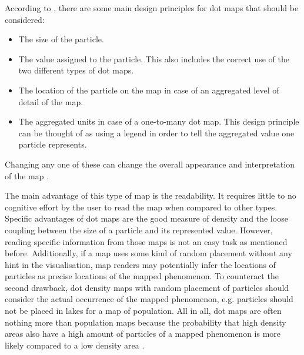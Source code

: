 According to \citeauthor{Tyner2010}, there are some main design principles for dot maps that should be considered:
\begin{itemize}
\item The size of the particle.
\item The value assigned to the particle. This also includes the correct use of the two different types of dot maps.
\item The location of the particle on the map in case of an aggregated level of detail of the map.
\item The aggregated units in case of a one-to-many dot map. This design principle can be thought of as using a legend in order to tell the aggregated value one particle represents.
\end{itemize}
Changing any one of these can change the overall appearance and interpretation of the map .

\cbstart
The main advantage of this type of map is the readability. It requires little to no cognitive effort by the user to read the map when compared to other types. Specific advantages of dot maps are the good measure of density and the loose coupling between the size of a particle and its represented value.
However, reading specific information from those maps is not an easy task as mentioned before. Additionally, if a map uses some kind of random placement without any hint in the visualisation, map readers may potentially infer the locations of particles as precise locations of the mapped phenomenon. To counteract the second drawback, dot density maps with random placement of particles should consider the actual occurrence of the mapped phenomenon, e.g. particles should not be placed in lakes for a map of population.
All in all, dot maps are often nothing more than population maps because the probability that high density areas also have a high amount of particles of a mapped phenomenon is more likely compared to a low density area .
\cbend
